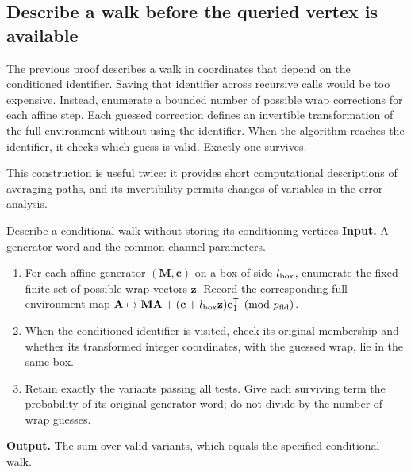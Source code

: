 \documentclass[11pt]{article}
\numberwithin{equation}{section}
\theoremstyle{definition}
\theoremstyle{remark}
\begin{document}
\subsection{Describe a walk before the queried vertex is available}

The previous proof describes a walk in coordinates that depend on the conditioned identifier. Saving that identifier across recursive calls would be too expensive. Instead, enumerate a bounded number of possible wrap corrections for each affine step. Each guessed correction defines an invertible transformation of the full environment without using the identifier. When the algorithm reaches the identifier, it checks which guess is valid. Exactly one survives.

This construction is useful twice: it provides short computational descriptions of averaging paths, and its invertibility permits changes of variables in the error analysis.

\begin{algorithm}[label=alg:conditional-step]{Describe a conditional walk without storing its conditioning vertices}
\textbf{Input.} A generator word and the common channel parameters.
\begin{enumerate}[leftmargin=*]
\item For each affine generator $({\mathbf{M}},{\mathbf{c}})$ on a box of side ${l_{\rm box}}$, enumerate the fixed finite set of possible wrap vectors ${\mathbf{z}}$. Record the corresponding full-environment map ${\mathbf{A}}\mapsto {\mathbf{M}}{\mathbf{A}}+({\mathbf{c}}+{l_{\rm box}}{\mathbf{z}}){\mathbf{e}}_1^{\mathsf T}\pmod {p_{\rm fld}}$.
\item When the conditioned identifier is visited, check its original membership and whether its transformed integer coordinates, with the guessed wrap, lie in the same box.
\item Retain exactly the variants passing all tests. Give each surviving term the probability of its original generator word; do not divide by the number of wrap guesses.
\end{enumerate}
\textbf{Output.} The sum over valid variants, which equals the specified conditional walk.
\end{algorithm}
\end{document}
